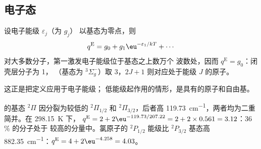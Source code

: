 \subsection*{电子态}

\begin{proposition}[电子配分函数]\label{prop:b3:partition-functions:q-elec}
设电子能级 $\varepsilon_j$（为 $g_j$）
以基态为零点，则
\[
  q^{\mathrm E} = g_0 + g_1\eu^{-\varepsilon_1/kT} + \cdots
\]
对大多数分子，第一激发电子能级位于基态之上数万个
波数处，因而 $q^{\mathrm E} = g_0$：闭壳层分子为 1，
（基态为 ${}^3\Sigma_g^-$）取 3，$2J + 1$ 则对应处于能级 $J$ 的原子。
\end{proposition}

这正是把定义应用于电子能级；
低能级起作用的情形，是具有的原子和自由基。

\begin{example}[一氧化氮与氯原子]\label{ex:b3:partition-functions:no-cl}
 的基态 ${}^2\Pi$ 因分裂为较低的 ${}^2\Pi_{1/2}$ 和
${}^2\Pi_{3/2}$，后者高 \qty{119.73}{cm^{-1}}，两者均为二重简并。在 \qty{298.15}{K} 下，
$q^{\mathrm E} = 2 + 2\eu^{-119.73/207.22} = 2 + 2\times0.561 = 3.12$：36\,\% 的分子处于
较高的分量中。氯原子的 ${}^2P_{1/2}$ 能级比
${}^2P_{3/2}$ 基态高 \qty{882.35}{cm^{-1}}：$q^{\mathrm E} = 4 + 2\eu^{-4.258} = 4.03$。
\end{example}

